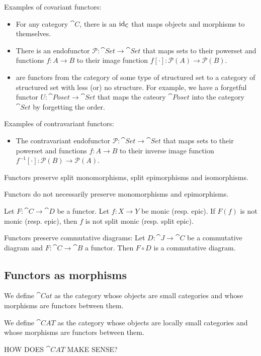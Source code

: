 \begin{example}
Examples of covariant functors:
\begin{itemize}
\item For any category $\cat{C}$, there is an  $\operatorname{id}_{\mathsf{C}}$ that maps objects and morphisms to themselves.
\item There is an endofunctor $\mathcal{P}:\cat{Set} \to \cat{Set}$ that maps sets to their powerset and functions $f:A\to B$ to their image function $f[\cdot]:\mathcal{P}(A)\to \mathcal{P}(B)$.
\item {} are functors from the category of some type of structured set to a category of structured set with less (or) no structure. For example, we have a forgetful functor $U: \cat{Poset} \to \cat{Set}$ that maps the cateory $\cat{Poset}$ into the category $\cat{Set}$ by forgetting the order. 
\end{itemize}
Examples of contravariant functors:
\begin{itemize}
\item The contravariant endofunctor $\mathcal{P}:\cat{Set} \to \cat{Set}$ that maps sets to their powerset and functions $f:A\to B$ to their inverse image function $f^{-1}[\cdot]:\mathcal{P}(B)\to \mathcal{P}(A)$.
\end{itemize}
\end{example}

\begin{lemma} \label{functorMorphismPreservation}
Functors preserve split monomorphisms, split epimorphisms and isomorphisms.
\end{lemma}
Functors do not necessarily preserve monomorphisms and epimorphisms.
\begin{corollary}
Let $F:\cat{C}\to \cat{D}$ be a functor. Let $f:X \to Y$ be monic (resp. epic). If $F(f)$ is not monic (resp. epic), then $f$ is not split monic (resp. split epic).
\end{corollary}

\begin{lemma}
Functors preserve commutative diagrams: Let $D:\cat{J}\to \cat{C}$ be a commutative diagram and $F:\cat{C}\to \cat{B}$ a functor. Then $F\circ D$ is a commutative diagram.
\end{lemma}

\subsection{Functors as morphisms}
\begin{definition}
We define $\cat{Cat}$ as the category whose objects are small categories and whose morphisms are functors between them.

We define $\cat{CAT}$ as the category whose objects are locally small categories and whose morphisms are functors between them.
\end{definition}
HOW DOES $\cat{CAT}$ MAKE SENSE?

